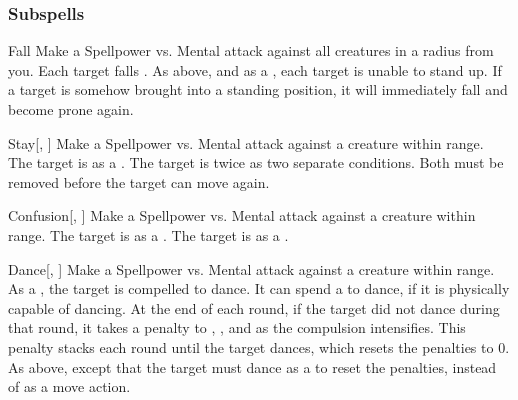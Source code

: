 \subsubsection{Subspells}


\begin{ability}[\nth{1}]{Fall}
Make a Spellpower vs. Mental attack against all creatures in a \areamed radius from you.
\hit Each target falls .
\crit As above, and as a , each target is unable to stand up.
If a target is somehow brought into a standing position, it will immediately fall and become prone again.
\end{ability}
\vspace{0.25em}


\begin{ability}[\nth{1}]{Stay}[, ]
Make a Spellpower vs. Mental attack against a creature within \rngmed range.
\hit The target is \immobilized as a .
\crit The target is  twice as two separate conditions.
Both must be removed before the target can move again.
\end{ability}
\vspace{0.25em}


\begin{ability}[\nth{2}]{Confusion}[, ]
Make a Spellpower vs. Mental attack against a creature within \rngmed range.
\hit The target is \disoriented as a .
\crit The target is \confused as a .
\end{ability}
\vspace{0.25em}


\begin{ability}[\nth{3}]{Dance}[, ]
Make a Spellpower vs. Mental attack against a creature within \rngmed range.
\hit As a , the target is compelled to dance.
It can spend a  to dance, if it is physically capable of dancing.
At the end of each round, if the target did not dance during that round, it takes a  penalty to , , and  as the compulsion intensifies.
This penalty stacks each round until the target dances, which resets the penalties to 0.
\crit As above, except that the target must dance as a  to reset the penalties, instead of as a move action.
\end{ability}
\vspace{0.25em}


